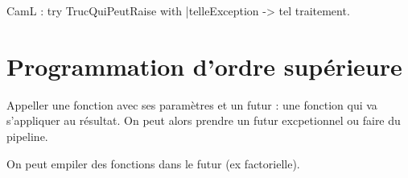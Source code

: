\documentclass[french]{article}
\begin{document}
CamL : try TrucQuiPeutRaise with |telleException -> tel traitement.

\section{Programmation d'ordre supérieure}
Appeller une fonction avec ses paramètres et un futur : une fonction qui va s'appliquer au résultat. On peut alors prendre un futur excpetionnel ou faire du pipeline.

On peut empiler des fonctions dans le futur (ex factorielle).

\end{document}
